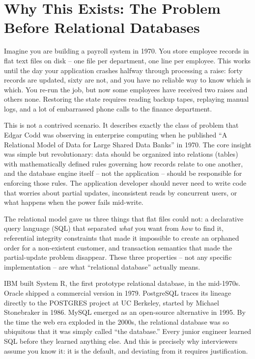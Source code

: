 \documentclass[11pt,a4paper]{article}
\begin{document}
\newpage

\tableofcontents

\newpage

\section{Why This Exists: The Problem Before Relational Databases}

Imagine you are building a payroll system in 1970. You store employee records in flat text files on disk -- one file per department, one line per employee. This works until the day your application crashes halfway through processing a raise: forty records are updated, sixty are not, and you have no reliable way to know which is which. You re-run the job, but now some employees have received two raises and others none. Restoring the state requires reading backup tapes, replaying manual logs, and a lot of embarrassed phone calls to the finance department.

This is not a contrived scenario. It describes exactly the class of problem that Edgar Codd was observing in enterprise computing when he published ``A Relational Model of Data for Large Shared Data Banks'' in 1970. The core insight was simple but revolutionary: data should be organized into relations (tables) with mathematically defined rules governing how records relate to one another, and the database engine itself -- not the application -- should be responsible for enforcing those rules. The application developer should never need to write code that worries about partial updates, inconsistent reads by concurrent users, or what happens when the power fails mid-write.

The relational model gave us three things that flat files could not: a declarative query language (SQL) that separated \emph{what} you want from \emph{how} to find it, referential integrity constraints that made it impossible to create an orphaned order for a non-existent customer, and transaction semantics that made the partial-update problem disappear. These three properties -- not any specific implementation -- are what ``relational database'' actually means.

IBM built System R, the first prototype relational database, in the mid-1970s. Oracle shipped a commercial version in 1979. PostgreSQL traces its lineage directly to the POSTGRES project at UC Berkeley, started by Michael Stonebraker in 1986. MySQL emerged as an open-source alternative in 1995. By the time the web era exploded in the 2000s, the relational database was so ubiquitous that it was simply called ``the database.'' Every junior engineer learned SQL before they learned anything else. And this is precisely why interviewers assume you know it: it is the default, and deviating from it requires justification.
\end{document}
